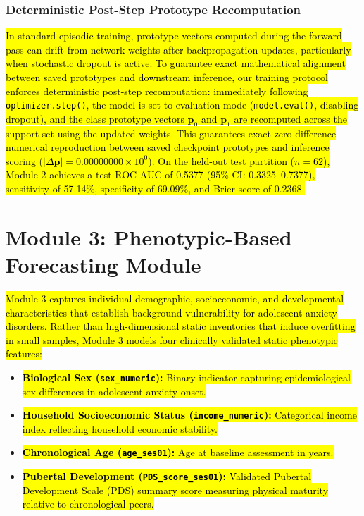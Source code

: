 \documentclass[10pt,letterpaper]{article}
\begin{document}
        \subsubsection*{\textbf{Deterministic Post-Step Prototype Recomputation}}
        \hl{In standard episodic training, prototype vectors computed during the forward pass can drift from network weights after backpropagation updates, particularly when stochastic dropout is active. To guarantee exact mathematical alignment between saved prototypes and downstream inference, our training protocol enforces deterministic post-step recomputation: immediately following \texttt{optimizer.step()}, the model is set to evaluation mode (\texttt{model.eval()}, disabling dropout), and the class prototype vectors $\mathbf{p}_0$ and $\mathbf{p}_1$ are recomputed across the support set using the updated weights. This guarantees exact zero-difference numerical reproduction between saved checkpoint prototypes and inference scoring ($|\Delta \mathbf{p}| = 0.00000000\times 10^0$). On the held-out test partition ($n=62$), Module 2 achieves a test ROC-AUC of 0.5377 (95\% CI: 0.3325--0.7377), sensitivity of 57.14\%, specificity of 69.09\%, and Brier score of 0.2368.}

        \section*{Module 3: Phenotypic-Based Forecasting Module}

        \hl{Module 3 captures individual demographic, socioeconomic, and developmental characteristics that establish background vulnerability for adolescent anxiety disorders. Rather than high-dimensional static inventories that induce overfitting in small samples, Module 3 models four clinically validated static phenotypic features:}
        \begin{itemize}
            \item \hl{\textbf{Biological Sex (\texttt{sex\_numeric}):} Binary indicator capturing epidemiological sex differences in adolescent anxiety onset.}
            \item \hl{\textbf{Household Socioeconomic Status (\texttt{income\_numeric}):} Categorical income index reflecting household economic stability.}
            \item \hl{\textbf{Chronological Age (\texttt{age\_ses01}):} Age at baseline assessment in years.}
            \item \hl{\textbf{Pubertal Development (\texttt{PDS\_score\_ses01}):} Validated Pubertal Development Scale (PDS) summary score measuring physical maturity relative to chronological peers.}
        \end{itemize}
\end{document}
